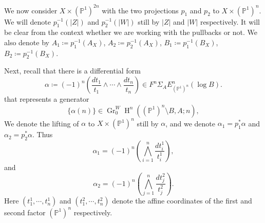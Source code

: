 \documentclass[11pt,a4paper]{amsart}
\renewcommand{\P}{\mathds{P}}
\DeclareMathOperator {\Gr} {Gr}
\DeclareMathOperator{\rH}{H}
\numberwithin{equation}{section}
\theoremstyle{plain}
\theoremstyle{definition}
\begin{document}
We now consider $X\times (\P^{1})^{2n}$ with the
two projections $p_{1}$ and $p_{2}$ to $X\times (\P^{1})^{n} $. We
will denote $p^{-1}_{1}(|Z|)$ and $p^{-1}_{2}(|W|)$ still by
$|Z|$  and $|W|$ respectively. It will be clear from the context
whether we are working with the pullbacks or not. We also denote by
$A_{1}\coloneqq p^{-1}_{1}(A_X)$, $A_{2}\coloneqq p^{-1}_{2}(A_{X})$,
$B_{1}\coloneqq p^{-1}_{1}(B_{X})$,
$B_{2}\coloneqq p^{-1}_{2}(B_{X})$.

Next, recall that there is a differential form
\begin{displaymath} \alpha
\coloneqq(-1)^{n}\left(\frac{dt_{1}}{t_{1}}\wedge\cdots\wedge
\frac{dt_{n}}{t_{n}}\right)\in F^{n}\Sigma_{A}E^{n}_{(\P^1)^{n}}(\log
B).
\end{displaymath} that represents a generator
\begin{displaymath}
\{\alpha (n)\} \in \Gr^{W}_{0}\rH^{n}((\P^{1})^{n}\setminus B, A; n),
\end{displaymath}
We denote the lifting of $\alpha $ to $X\times
(\P^{1})^{n}$ still by $\alpha$, and we denote $\alpha
_{1}=p_{1}^{\ast}\alpha $ and $\alpha _{2}=p_{2}^{\ast} \alpha $. Thus 
\begin{displaymath}
\alpha_{1}=(-1)^{n}\left(\bigwedge_{i=1}^{n}\frac{dt^{1}_{i}}{t^{1}_{i}}\right),
\end{displaymath}
and
\begin{displaymath}
\alpha_{2}=(-1)^{n}\left(\bigwedge_{j=1}^{n}\frac{dt^{2}_{j}}{t^{2}_{j}}\right).
\end{displaymath}
Here $(t^{1}_{1},\cdots, t^{1}_{n})$ and $(t^{2}_{1},\cdots,
t^{2}_{n})$ denote the affine coordinates of the first and second
factor $(\P^1)^{n}$ respectively.
\end{document}

